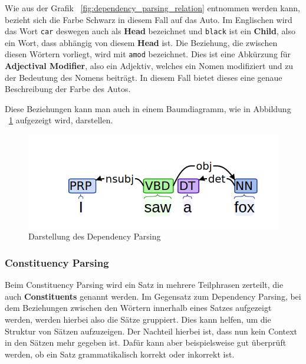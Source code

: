 Wie aus der Grafik ~\ref{fig:dependency_parsing_relation} entnommen werden kann, bezieht sich die Farbe Schwarz in diesem Fall auf das Auto.
Im Englischen wird das Wort \texttt{car} deswegen auch als \textbf{Head} bezeichnet und \texttt{black} ist ein \textbf{Child}, also ein Wort, dass abhängig von diesem \textbf{Head} ist.
Die Beziehung, die zwischen diesen Wörtern vorliegt, wird mit \texttt{amod} bezeichnet.
Dies ist eine Abkürzung für \textbf{Adjectival Modifier}, also ein Adjektiv, welches ein Nomen modifiziert und zu der Bedeutung des Nomens beiträgt.
In diesem Fall bietet dieses eine genaue Beschreibung der Farbe des Autos.\cite{dependencyParsing}

Diese Beziehungen kann man auch in einem Baumdiagramm, wie in Abbildung ~\ref{fig:dependency_parsing_tree} aufgezeigt wird, darstellen.

\begin{figure}[hbt!]
    \centering
    \includegraphics[scale=0.5]{pics/dependency_parse_tree}
    \caption{Darstellung des Dependency Parsing~\cite{dependencyVsConstituencyParsing}}
    \label{fig:dependency_parsing_tree}
\end{figure}

\subsubsection{Constituency Parsing}\label{subsubsec:constituency-parsing}

Beim Constituency Parsing wird ein Satz in mehrere Teilphrasen zerteilt, die auch \textbf{Constituents} genannt werden.
Im Gegensatz zum Dependency Parsing, bei dem Beziehungen zwischen den Wörtern innerhalb eines Satzes aufgezeigt werden, werden hierbei also die Sätze gruppiert.
Dies kann helfen, um die Struktur von Sätzen aufzuzeigen.
Der Nachteil hierbei ist, dass nun kein Context in den Sätzen mehr gegeben ist.
Dafür kann aber beispielsweise gut überprüft werden, ob ein Satz grammatikalisch korrekt oder inkorrekt ist.\cite{machineLearningTextAnalysis}


